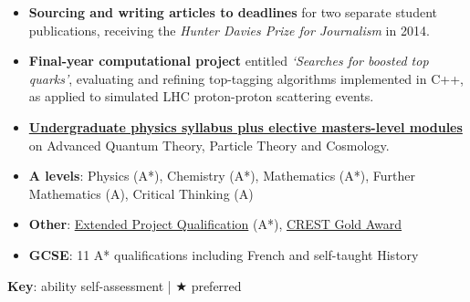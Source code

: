 \documentclass[10pt,a4paper]{cv_template}
\begin{document}
\begin{paracol}{2}
\begin{itemize}
  \item \textbf{Sourcing and writing articles to deadlines} for two separate student publications, receiving the \textit{Hunter Davies Prize for Journalism} in 2014.
\end{itemize}



\begin{itemize}
  \item \textbf{Final-year computational project} entitled \textit{`Searches for
boosted top quarks'}, evaluating and refining top-tagging algorithms implemented in C++, as applied to simulated LHC proton-proton scattering events.
  \item \textbf{\href{https://www.dur.ac.uk/physics/modules/}{Undergraduate physics syllabus plus elective masters-level modules}} on Advanced Quantum Theory, Particle Theory and Cosmology.
\end{itemize}
\divider

\begin{itemize}
  \item \textbf{A levels}: Physics (A*), Chemistry (A*), Mathematics (A*), Further Mathematics (A), Critical Thinking (A)
  \item \textbf{Other}: \href{https://qips.ucas.com/qip/extended-project-qualification-epq}{Extended Project Qualification} (A*), \href{https://www.crestawards.org/crest-gold}{CREST Gold Award}
  \item \textbf{GCSE}: 11 A* qualifications including French and self-taught History
\end{itemize}

\switchcolumn



\textbf{Key}: \LEFTcircle \enspace ability self-assessment | $\bigstar$ preferred

\divider

\vspace{0.5ex}


\end{paracol}
\end{document}
